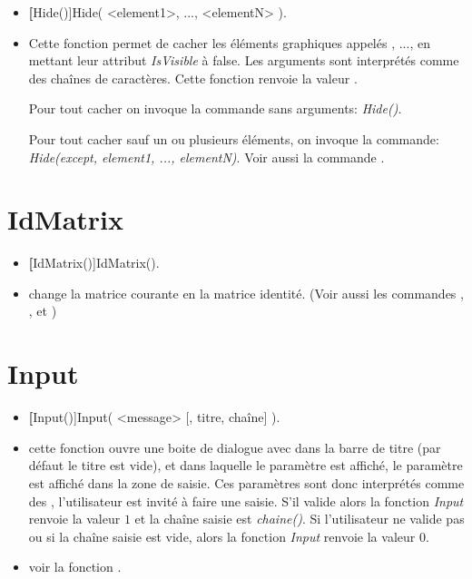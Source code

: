 \begin{itemize}
 \item \util \textbf[Hide()]{Hide( <element1>, ..., <elementN> )}.
 \item \desc Cette fonction permet de cacher les éléments graphiques appelés , ...,  en
mettant leur attribut \textsl{IsVisible} à false. Les arguments sont interprétés comme des chaînes de caractères. Cette
fonction renvoie la valeur \Nil.

Pour tout cacher on invoque la commande sans arguments: \textsl{Hide()}. 

Pour tout cacher sauf un ou plusieurs éléments, on invoque la commande: \textsl{Hide(except, element1, ..., elementN)}.
Voir aussi la commande .
\end{itemize}

\section{IdMatrix}\label{cmdIdMatrix}

\begin{itemize}
 \item \util \textbf[IdMatrix()]{IdMatrix()}.
 \item \desc change la matrice courante en la matrice identité. (Voir aussi les commandes , , et )
\end{itemize}

\section{Input}\label{cmdInput}

\begin{itemize}
 \item \util \textbf[Input()]{Input( <message> [, titre, chaîne] )}.
 \item \desc cette fonction ouvre une boite de dialogue avec  dans la barre de titre (par défaut le titre est vide), et dans laquelle le paramètre  est affiché, le paramètre  est affiché dans la zone de saisie. Ces paramètres sont donc interprétés comme des , l'utilisateur est invité à faire une saisie. S'il valide alors la fonction \textsl{Input} renvoie la valeur $1$ et la chaîne saisie est  \textsl{chaine()}. Si l'utilisateur ne valide pas ou si la chaîne saisie est vide, alors la fonction \textsl{Input} renvoie la valeur $0$. 
 \item \exem voir la fonction .
\end{itemize}

